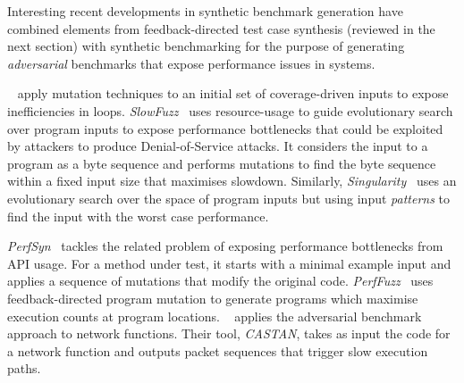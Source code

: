 Interesting recent developments in synthetic benchmark generation have combined elements from feedback-directed test case synthesis (reviewed in the next section) with synthetic benchmarking for the purpose of generating \emph{adversarial} benchmarks that expose performance issues in systems.

\citeauthor{Dhok2016}~\cite{Dhok2016} apply mutation techniques to an initial set of coverage-driven inputs to expose inefficiencies in loops.
\emph{SlowFuzz}~\cite{Petsios2017} uses resource-usage to guide evolutionary search over program inputs to expose performance bottlenecks that could be exploited by attackers to produce Denial-of-Service attacks. It considers the input to a program as a byte sequence and performs mutations to find the byte sequence within a fixed input size that maximises slowdown.
Similarly, \emph{Singularity}~\cite{Wei2018} uses an evolutionary search over the space of program inputs but using input \emph{patterns} to find the input with the worst case performance.

\emph{PerfSyn}~\cite{Toffola2018} tackles the related problem of exposing performance bottlenecks from API usage. For a method under test, it starts with a minimal example input and applies a sequence of mutations that modify the original code.
\emph{PerfFuzz}~\cite{Lemieux2018} uses feedback-directed program mutation to generate programs which maximise execution counts at program locations.
\citeauthor{Pedrosa2018}~\cite{Pedrosa2018} applies the adversarial benchmark approach to network functions. Their tool, \emph{CASTAN}, takes as input the code for a network function and outputs packet sequences that trigger slow execution paths.

